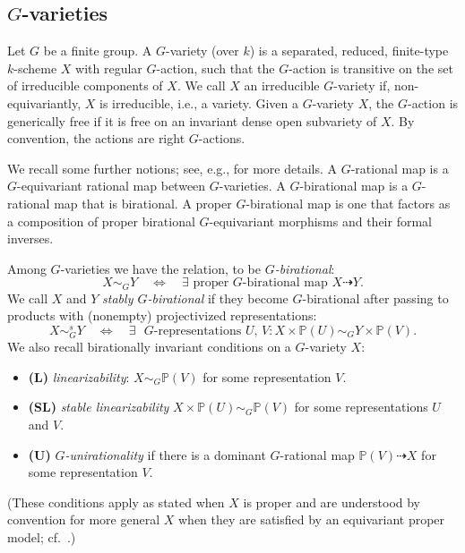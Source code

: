 \documentclass[10pt,a4paper]{amsart}
\numberwithin{equation}{section}
\def\bP{{\mathbb P}}
\begin{document}
\subsection*{$G$-varieties}
Let $G$ be a finite group.
A $G$-variety (over $k$) is a separated, reduced, finite-type $k$-scheme $X$ with regular $G$-action, such that the $G$-action is transitive on the set of irreducible components of $X$.
We call $X$ an irreducible $G$-variety if, non-equivariantly, $X$ is irreducible, i.e., a variety.
Given a $G$-variety $X$, the $G$-action is generically free if it is free on an invariant dense open subvariety of $X$.
By convention, the actions are right $G$-actions.

We recall some further notions; see, e.g., \cite[\S 3.1]{KTsurvey} for more details.
A $G$-rational map is a $G$-equivariant rational map between $G$-varieties.
A $G$-birational map is a $G$-rational map that is birational.
A proper $G$-birational map is one that factors as a composition of proper birational $G$-equivariant morphisms and their formal inverses.





Among $G$-varieties we have the relation, to be \emph{$G$-birational}:
\[ X\sim_GY\quad\Leftrightarrow\quad
\exists\text{ proper $G$-birational map $X\dashrightarrow Y$}. \]
We call $X$ and $Y$ \emph{stably $G$-birational} if they become $G$-birational after passing to products with (nonempty) projectivized representations:
\[ X\sim_G^sY\quad \Leftrightarrow\quad
\exists\text{ $G$-representations $U$, $V$}\colon X\times \bP(U)\sim_G Y\times \bP(V). \]
We also recall birationally invariant conditions on a $G$-variety $X$:
\begin{itemize}
\item \textbf{(L)} \emph{linearizability}: $X\sim_G\bP(V)$ for some representation $V$.
\item \textbf{(SL)} \emph{stable linearizability} $X\times \bP(U)\sim_G\bP(V)$ for some representations $U$ and $V$.
\item \textbf{(U)} \emph{$G$-unirationality} if there is a dominant $G$-rational map $\bP(V)\dashrightarrow X$ for some representation $V$.
\end{itemize}
(These conditions apply as stated when $X$ is proper and are understood by convention for more general $X$ when they are satisfied by an equivariant proper model; cf.\ \cite[\S 3.1]{KTsurvey}.)
\end{document}
